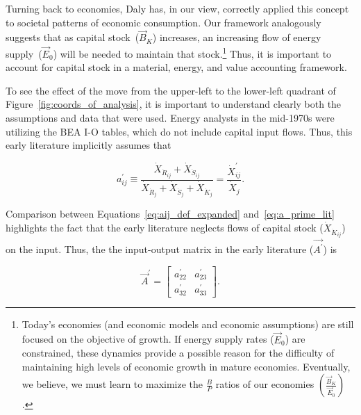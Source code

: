 Turning back to economies,
Daly has, in our view,
correctly applied this concept to societal patterns
of economic consumption.\cite{Daly1995}
Our framework analogously suggests that
as capital stock~($\vec{B}_{K}$) increases,
an increasing flow of energy supply~($\vec{E}_{0}$)
will be needed to maintain that stock.\footnote{Today's economies 
	(and economic models and economic assumptions) are still focused
	on the objective of growth.
	If energy supply rates ($\vec{E}_{0}$) are constrained,
	these dynamics provide a possible reason for the difficulty
	of maintaining high levels of economic growth
	in mature economies.
	Eventually, we believe,
	we must learn to maximize the $\frac{B}{P}$
	ratios of our economies 
	$\left(\frac{\vec{B}_{K}}{\vec{E}_{0}}\right)$.}
Thus, it is important to account for capital stock in 
a material, energy, and value accounting framework.

To see the effect of the move from the upper-left to the lower-left
quadrant of Figure~\ref{fig:coords_of_analysis}, 
it is important to understand clearly both the assumptions and data that were used.
Energy analysts in the mid-1970s were utilizing the BEA I-O tables,
which do not include capital input flows. 
Thus, this early literature implicitly assumes that 

\begin{equation} \label{eq:a_prime_lit}
	a_{ij}^{'} 
	\equiv \frac{\dot{X}_{\dot{R}_{ij}} + \dot{X}_{\dot{S}_{ij}}}
				{\dot{X}_{\dot{R}_{j}} + \dot{X}_{\dot{S}_{j}} + \dot{X}_{\dot{K}_{j}}}
	= \frac{\dot{X}_{ij}^{'}}{\dot{X}_{j}}.
\end{equation}

\noindent{}Comparison between Equations~\ref{eq:aij_def_expanded}
and~\ref{eq:a_prime_lit}
highlights the fact that the early literature neglects flows of capital stock
($\dot{X}_{\dot{K}_{ij}}$) on the input.
Thus, the the input-output matrix in the early literature
($\vec{A^{'}}$) is

\begin{equation} \label{eq:A_matrix_def_literature}
	\vec{A}^{'} 
	=
	\begin{bmatrix}
		a_{22}^{'} & a_{23}^{'}	\\
		a_{32}^{'} & a_{33}^{'}	
	\end{bmatrix}.
\end{equation}

